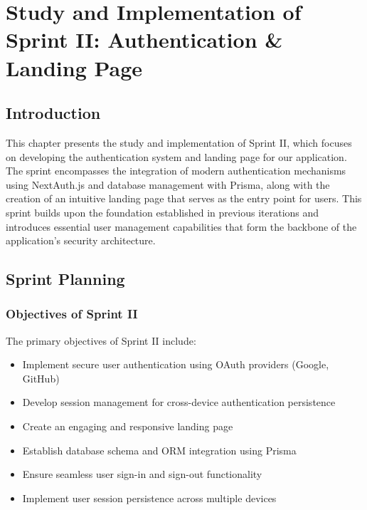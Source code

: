 \chapter[Sprint II]{Study and Implementation of Sprint II: Authentication \& Landing Page}

\minitoc

\section{Introduction}
This chapter presents the study and implementation of Sprint II, which focuses on developing the authentication system and landing page for our application. The sprint encompasses the integration of modern authentication mechanisms using NextAuth.js and database management with Prisma, along with the creation of an intuitive landing page that serves as the entry point for users. This sprint builds upon the foundation established in previous iterations and introduces essential user management capabilities that form the backbone of the application's security architecture.

\section{Sprint Planning}

\subsection{Objectives of Sprint II}
The primary objectives of Sprint II include:
\begin{itemize}
    \item Implement secure user authentication using OAuth providers (Google, GitHub)
    \item Develop session management for cross-device authentication persistence
    \item Create an engaging and responsive landing page
    \item Establish database schema and ORM integration using Prisma
    \item Ensure seamless user sign-in and sign-out functionality
    \item Implement user session persistence across multiple devices
\end{itemize}

